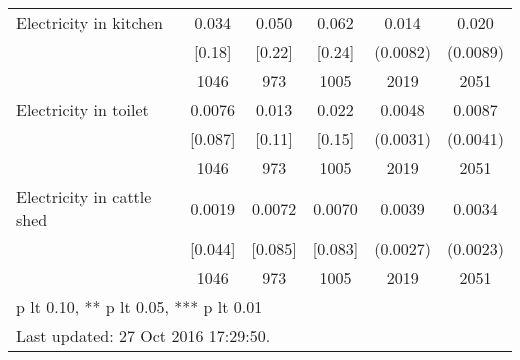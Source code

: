 \begin{table}[htbp]
\begin{tabular*}{0.9\hsize}{@{\hskip\tabcolsep\extracolsep\fill}l*{1}{ccccc}}
Electricity in kitchen          &    0.034&    0.050&    0.062&    0.014\sym{*}  &    0.020\sym{**} \\
                                &   [0.18]&   [0.22]&   [0.24]& (0.0082)         & (0.0089)         \\
                                &     1046&      973&     1005&     2019         &     2051         \\
Electricity in toilet           &   0.0076&    0.013&    0.022&   0.0048         &   0.0087\sym{**} \\
                                &  [0.087]&   [0.11]&   [0.15]& (0.0031)         & (0.0041)         \\
                                &     1046&      973&     1005&     2019         &     2051         \\
Electricity in cattle shed      &   0.0019&   0.0072&   0.0070&   0.0039         &   0.0034         \\
                                &  [0.044]&  [0.085]&  [0.083]& (0.0027)         & (0.0023)         \\
                                &     1046&      973&     1005&     2019         &     2051         \\
\bottomrule
\multicolumn{6}{l}{\footnotesize * p lt 0.10, ** p lt 0.05, *** p lt 0.01}\\
\multicolumn{6}{l}{\footnotesize Last updated: 27 Oct 2016 17:29:50.}\\
\end{tabular*}
\end{table}
